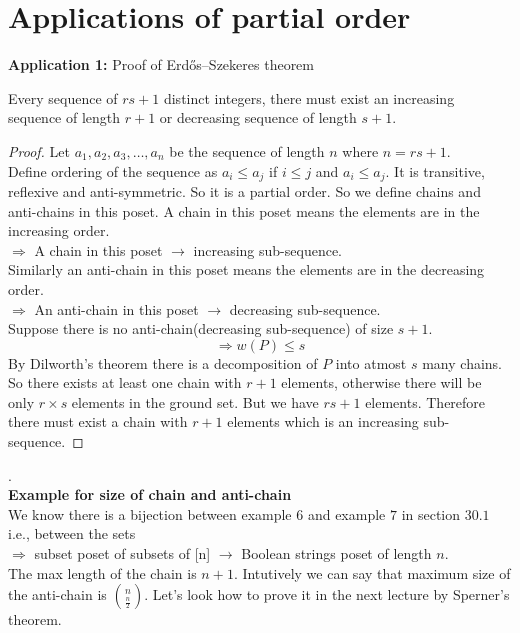 \section{Applications of partial order}
\textbf{Application 1:} Proof of Erdős–Szekeres theorem\\
\begin{theorem}
Every sequence of $rs+1$ distinct integers, there must exist an increasing sequence of length $r+1$ or decreasing sequence of length $s+1$.
\begin{proof}
Let $a_1,a_2,a_3,\ldots,a_n$ be the sequence of length $n$ where $n = rs+1$.\\
Define ordering of the sequence as $a_i \leq a_j$ if $i\leq j$ and $a_i \leq a_j$. It is transitive, reflexive and anti-symmetric. So it is a partial order. So we define chains and anti-chains in this poset. A chain in this poset means the elements are in the increasing order.\\
$\Rightarrow$ A chain in this poset $\rightarrow$ increasing sub-sequence.\\
Similarly an anti-chain in this poset means the elements are in the decreasing order.\\
$\Rightarrow$ An anti-chain in this poset $\rightarrow$ decreasing sub-sequence.\\
Suppose there is no anti-chain(decreasing sub-sequence) of size $s+1$.
$$\Rightarrow w(P) \leq s$$
By Dilworth's theorem there is a decomposition of $P$ into atmost $s$ many chains. So there exists at least one chain with $r+1$ elements, otherwise there will be only $r\times s$ elements in the ground set. But we have $rs+1$ elements. Therefore there must exist a chain with $r+1$ elements which is an increasing sub-sequence.
\end{proof}
\end{theorem}
.\\
\textbf{Example for size of chain and anti-chain}\\
We know there is a bijection between example $6$ and example $7$ in section $30.1$ i.e., between the sets\\
$\Rightarrow$ subset poset of subsets of [n] $\rightarrow$ Boolean strings poset of length $n$.\\
The max length of the chain is $n+1$. Intutively we can say that maximum size of the anti-chain is $n \choose \frac{n}{2}$. Let's look how to prove it in the next lecture by Sperner's theorem.
